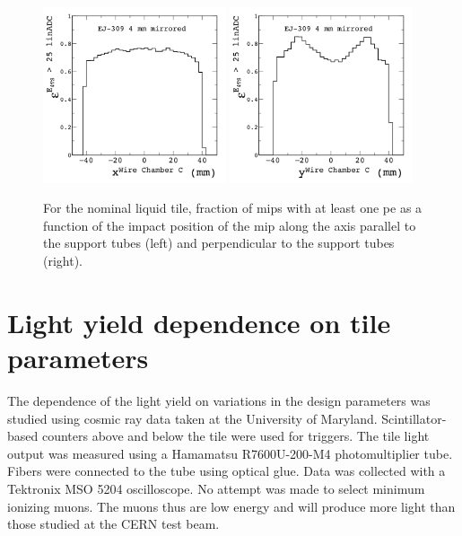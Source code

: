 \documentclass[review]{elsarticle}
\begin{document}
\begin{figure}[h]
\centering\includegraphics[width=0.48\textwidth]{./figures/fiducial2.png}
\centering\includegraphics[width=0.48\textwidth]{./figures/fiducial3.png}
\caption{For the nominal liquid tile, fraction of mips with at least
  one pe as a function of the impact position of the mip along the
  axis parallel to the support tubes (left) and perpendicular to the
  support tubes (right).%
}
\label{fig:fiducial}
\end{figure}

\section{Light yield dependence on tile parameters}

The dependence of the light yield on variations in the design
parameters was studied using cosmic ray data taken at the University
of Maryland. Scintillator-based counters above and below the tile
were used for triggers. The tile light output was measured using a
Hamamatsu R7600U-200-M4 photomultiplier tube. Fibers were connected
to the tube using optical glue. Data was collected with a Tektronix
MSO 5204 oscilloscope. No attempt was made to select minimum ionizing
muons. The muons thus are low energy and will produce more light than
those studied at the CERN test beam.
\end{document}
